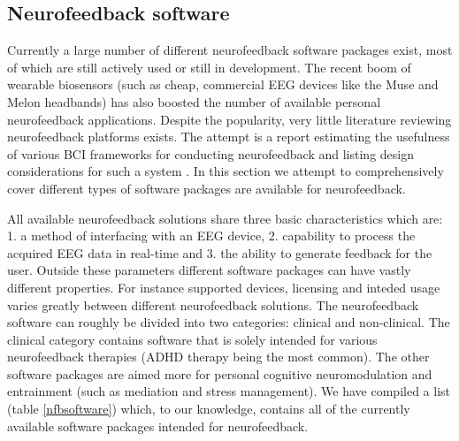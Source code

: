 \subsection{Neurofeedback software}
Currently a large number of different neurofeedback software packages exist, most of which are still actively used or still in development. The recent boom of wearable biosensors (such as cheap, commercial EEG devices like the Muse and Melon headbands) has also boosted the number of available personal neurofeedback applications. Despite the popularity, very little literature reviewing neurofeedback platforms exists. The attempt is a report estimating the usefulness of various BCI frameworks for conducting neurofeedback and listing design considerations for such a system  \cite{huster2014brain}. In this section we attempt to comprehensively cover different types of software packages are available for neurofeedback.

All available neurofeedback solutions share three basic characteristics which are: 1. a method of interfacing with an EEG device, 2. capability to process the acquired EEG data in real-time and 3. the ability to generate feedback for the user. Outside these parameters different software packages can have vastly different properties. For instance supported devices, licensing and inteded usage varies greatly between different neurofeedback solutions. The neurofeedback software can roughly be divided into two categories: clinical and non-clinical. The clinical category contains software that is solely intended for various neurofeedback therapies (ADHD therapy being the most common). The other software packages are aimed more for personal cognitive neuromodulation and entrainment (such as mediation and stress management). We have compiled a list (table \ref{nfbsoftware}) which, to our knowledge, contains all of the currently available software packages intended for neurofeedback. 

